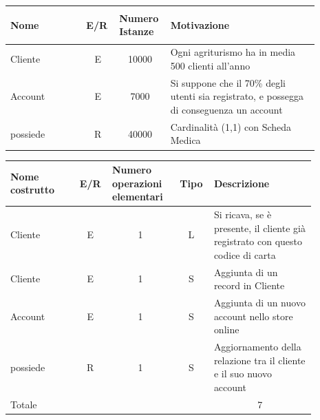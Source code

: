 \documentclass[12pt,a4paper]{article}
\begin{document}
\begin{center}\setlength{\extrarowheight}{1.5pt}\begin{longtable}{|p{0.23\linewidth}|p{0.1\linewidth}|p{0.11\linewidth}|p{0.45\linewidth}|}



\hline \textbf{Nome}   & \begin{center}\vspace{-15pt}\textbf{E/R}\end{center} & \textbf{Numero Istanze} & \textbf{Motivazione}\\ 

\hline
Cliente
 & 
\multicolumn{1}{|c|}{E}
 & 
\multicolumn{1}{|c|}{10000}
 & 
Ogni agriturismo ha in media 500 clienti all'anno
\\

\hline
Account
 & 
\multicolumn{1}{|c|}{E}
 & 
\multicolumn{1}{|c|}{7000}
 & 
Si suppone che il 70\% degli utenti sia registrato, e possegga di conseguenza un account
\\

\hline
possiede
 & 
\multicolumn{1}{|c|}{R}
 & 
\multicolumn{1}{|c|}{40000}
 & 
Cardinalità (1,1) con Scheda Medica
\\


\hline



\end{longtable}\end{center}

\begin{center}\setlength{\extrarowheight}{1.5pt}\begin{longtable}{|p{0.2\linewidth}|p{0.1\linewidth}|p{0.175\linewidth}|p{0.1\linewidth}|p{0.3\linewidth}|}\hline \textbf{Nome costrutto}   & \multicolumn{1}{|c|}{\textbf{E/R}} & \textbf{Numero operazioni elementari} & \multicolumn{1}{|c|}{\textbf{Tipo}} & \textbf{Descrizione}\\ 
\hline
Cliente
 & 
\multicolumn{1}{|c|}{E}
 & 
\multicolumn{1}{|c|}{1}
 & 
\multicolumn{1}{|c|}{L}
 & 
Si ricava, se è presente, il cliente già registrato con questo codice di carta
\\
\hline
Cliente
 & 
\multicolumn{1}{|c|}{E}
 & 
\multicolumn{1}{|c|}{1}
 & 
\multicolumn{1}{|c|}{S}
 & 
Aggiunta di un record in Cliente
\\
\hline
Account
 & 
\multicolumn{1}{|c|}{E}
 & 
\multicolumn{1}{|c|}{1}
 & 
\multicolumn{1}{|c|}{S}
 & 
Aggiunta di un nuovo account nello store online
\\
\hline
possiede
 & 
\multicolumn{1}{|c|}{R}
 & 
\multicolumn{1}{|c|}{1}
 & 
\multicolumn{1}{|c|}{S}
 & 
Aggiornamento della relazione tra il cliente e il suo nuovo account
\\
\hline
\multicolumn{4}{|l|}{Totale}
 & 
\multicolumn{1}{|c|}{7}
\\
\hline
\end{longtable}\end{center}
\pagebreak
\end{document}
